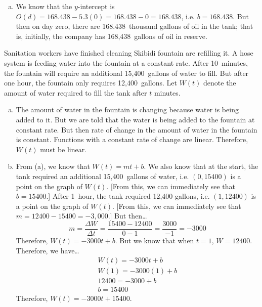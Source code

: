 \documentclass[12pt,letterpaper]{exam}
\begin{document}
\begin{questions}
{\begin{enumerate}[(a)]
\item We know that the $y$-intercept is $O(d)= 168.438 - 5.3(0)= 168.438 - 0= 168.438$, i.e. $b= 168.438$. But then on day zero, there are 168.438~thousand gallons of oil in the tank; that is, initially, the company has 168,438~gallons of oil in reserve. 
\end{enumerate}
}



\newpage
\question Sanitation workers have finished cleaning Skibidi fountain are refilling it. A hose system is feeding water into the fountain at a constant rate. After 10~minutes, the fountain will require an additional 15,400~gallons of water to fill. But after one hour, the fountain only requires 12,400~gallons. Let $W(t)$ denote the amount of water required to fill the tank after $t$ minutes. 
	 \pspace

\tsol
{\itshape
\begin{enumerate}[(a)]
\item The amount of water in the fountain is changing because water is being added to it. But we are told that the water is being added to the fountain at constant rate. But then rate of change in the amount of water in the fountain is constant. Functions with a constant rate of change are linear. Therefore, $W(t)$ must be linear. \pspace

\item From (a), we know that $W(t)= mt + b$. We also know that at the start, the tank required an additional 15,400~gallons of water, i.e. $(0, 15400)$ is a point on the graph of $W(t)$. [From this, we can immediately see that $b= 15400$.] After 1~hour, the tank required 12,400 gallons, i.e. $(1, 12400)$ is a point on the graph of $W(t)$. [From this, we can immediately see that $m= 12400 - 15400= -3,000$.] But then\dots
	\[
	m= \dfrac{\Delta W}{\Delta t}= \dfrac{15400 - 12400}{0 - 1}= \dfrac{3000}{-1}= -3000
	\]
Therefore, $W(t)= -3000t + b$. But we know that when $t= 1$, $W= 12400$. Therefore, we have\dots
	\[
	\begin{gathered}
	W(t)= -3000t + b \\
	W(1)= -3000(1) + b \\
	12400= -3000 + b \\
	b= 15400
	\end{gathered}
	\]
Therefore, $W(t)= -3000t + 15400$. 
\end{enumerate}
}




\end{questions}
\end{document}
